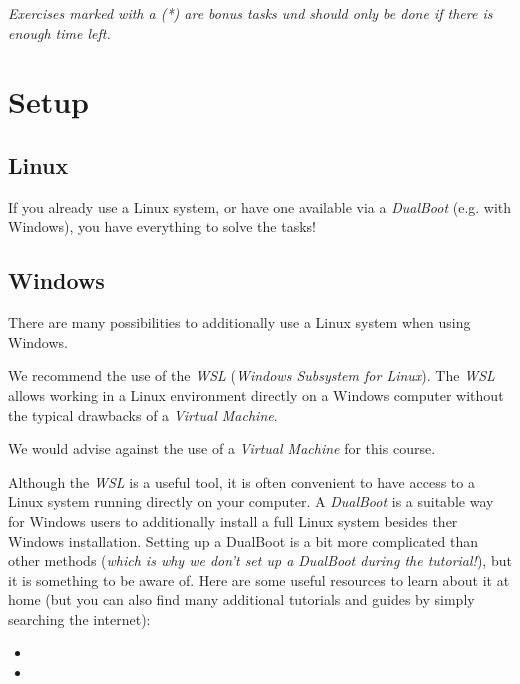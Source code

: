 \documentclass[english]{sheet}
\subtitle{Linux Exercise\textemdash Part 1}
\begin{document}
\maketitle

\textit{Exercises marked with a (*) are bonus tasks und should only be done if there is enough time left.}

\section{Setup}

\subsection{Linux}

If you already use a Linux system, or have one available via a \emph{DualBoot} (e.g. with Windows), you have everything to solve the tasks!

\subsection{Windows}

There are many possibilities to additionally use a Linux system when using Windows.

We recommend the use of the \emph{WSL} (\emph{Windows Subsystem for Linux}). The \emph{WSL} allows working in a Linux environment directly on a Windows computer without the typical drawbacks of a \emph{Virtual Machine}.

We would advise against the use of a \emph{Virtual Machine} for this course.

Although the \emph{WSL} is a useful tool, it is often convenient to have access to a Linux system running directly on your computer. A \emph{DualBoot} is a suitable way for Windows users to additionally install a full Linux system besides ther Windows installation. Setting up a DualBoot is a bit more complicated than other methods (\emph{which is why we don't set up a DualBoot during the tutorial!}), but it is something to be aware of. Here are some useful resources to learn about it at home (but you can also find many additional tutorials and guides by simply searching the internet):

\begin{itemize}
    \item {}
    \item {}
\end{itemize}
\end{document}
